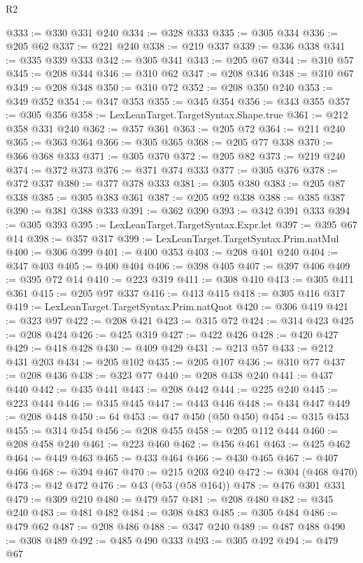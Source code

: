 \begin{lexlean}{R2}
\begin{coremodule}
@333 := @330 @331 @240
@334 := @328 @333
@335 := @305 @334
@336 := @205 @62
@337 := @221 @240
@338 := @219 @337
@339 := @336 @338
@341 := @335 @339 @333
@342 := @305 @341
@343 := @205 @67
@344 := @310 @57
@345 := @208 @344
@346 := @310 @62
@347 := @208 @346
@348 := @310 @67
@349 := @208 @348
@350 := @310 @72
@352 := @208 @350 @240
@353 := @349 @352
@354 := @347 @353
@355 := @345 @354
@356 := @343 @355
@357 := @305 @356
@358 := LexLeanTarget.TargetSyntax.Shape.true
@361 := @212 @358 @331 @240
@362 := @357 @361
@363 := @205 @72
@364 := @211 @240
@365 := @363 @364
@366 := @305 @365
@368 := @205 @77 @338
@370 := @366 @368 @333
@371 := @305 @370
@372 := @205 @82
@373 := @219 @240
@374 := @372 @373
@376 := @371 @374 @333
@377 := @305 @376
@378 := @372 @337
@380 := @377 @378 @333
@381 := @305 @380
@383 := @205 @87 @338
@385 := @305 @383 @361
@387 := @205 @92 @338
@388 := @385 @387
@390 := @381 @388 @333
@391 := @362 @390
@393 := @342 @391 @333
@394 := @305 @393
@395 := LexLeanTarget.TargetSyntax.Expr.let
@397 := @395 @67 @14
@398 := @357 @317
@399 := LexLeanTarget.TargetSyntax.Prim.natMul
@400 := @306 @399
@401 := @400 @353
@403 := @208 @401 @240
@404 := @347 @403
@405 := @400 @404
@406 := @398 @405
@407 := @397 @406
@409 := @395 @72 @14
@410 := @223 @319
@411 := @308 @410
@413 := @305 @411 @361
@415 := @205 @97 @337
@416 := @413 @415
@418 := @305 @416 @317
@419 := LexLeanTarget.TargetSyntax.Prim.natQuot
@420 := @306 @419
@421 := @323 @97
@422 := @208 @421
@423 := @315 @72
@424 := @314 @423
@425 := @208 @424
@426 := @425 @319
@427 := @422 @426
@428 := @420 @427
@429 := @418 @428
@430 := @409 @429
@431 := @213 @57
@433 := @212 @431 @203
@434 := @205 @102
@435 := @205 @107
@436 := @310 @77
@437 := @208 @436
@438 := @323 @77
@440 := @208 @438 @240
@441 := @437 @440
@442 := @435 @441
@443 := @208 @442
@444 := @225 @240
@445 := @223 @444
@446 := @345 @445
@447 := @443 @446
@448 := @434 @447
@449 := @208 @448
@450 := 64
@453 := @47 @450 (@50 @450)
@454 := @315 @453
@455 := @314 @454
@456 := @208 @455
@458 := @205 @112 @444
@460 := @208 @458 @240
@461 := @223 @460
@462 := @456 @461
@463 := @425 @462
@464 := @449 @463
@465 := @433 @464
@466 := @430 @465
@467 := @407 @466
@468 := @394 @467
@470 := @215 @203 @240
@472 := @304 (@468 @470)
@473 := @42 @472
@476 := @43 (@53 (@58 @164))
@478 := @476 @301 @331
@479 := @309 @210
@480 := @479 @57
@481 := @208 @480
@482 := @345 @240
@483 := @481 @482
@484 := @308 @483
@485 := @305 @484
@486 := @479 @62
@487 := @208 @486
@488 := @347 @240
@489 := @487 @488
@490 := @308 @489
@492 := @485 @490 @333
@493 := @305 @492
@494 := @479 @67

\end{coremodule}
\end{lexlean}
